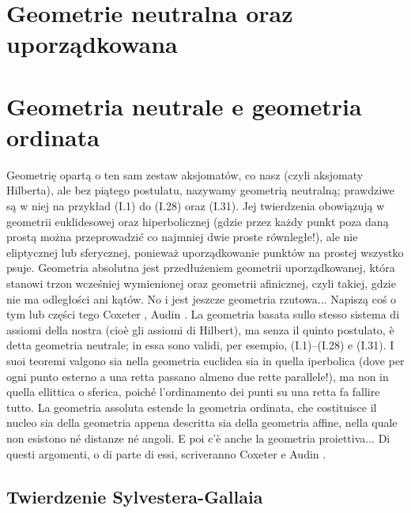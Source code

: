 
%

%

\section{Geometrie neutralna oraz uporządkowana} %
\section{Geometria neutrale e geometria ordinata} %

Geometrię opartą o ten sam zestaw aksjomatów, co nasz (czyli aksjomaty Hilberta), ale bez piątego postulatu, nazywamy geometrią neutralną; prawdziwe są w niej na przykład (I.1) do (I.28) oraz (I.31). %
Jej twierdzenia obowiązują w geometrii euklidesowej oraz hiperbolicznej (gdzie przez każdy punkt poza daną prostą można przeprowadzić co najmniej dwie proste równległe!), ale nie eliptycznej lub sferycznej, ponieważ uporządkowanie punktów na prostej wszystko psuje. %
Geometria absolutna jest przedłużeniem geometrii uporządkowanej, która stanowi trzon wcześniej wymienionej oraz geometrii afinicznej, czyli takiej, gdzie nie ma odległości ani kątów. %
No i jest jeszcze geometria rzutowa... %
Napiszą coś o tym lub części tego Coxeter \cite[s. 193, 194]{coxeter_1967}, Audin \cite[s. 13]{audin_2003}. %
La geometria basata sullo stesso sistema di assiomi della nostra (cioè gli assiomi di Hilbert), ma senza il quinto postulato, è detta geometria neutrale; in essa sono validi, per esempio, (I.1)--(I.28) e (I.31). %
I suoi teoremi valgono sia nella geometria euclidea sia in quella iperbolica (dove per ogni punto esterno a una retta passano almeno due rette parallele!), ma non in quella ellittica o sferica, poiché l'ordinamento dei punti su una retta fa fallire tutto. %
La geometria assoluta estende la geometria ordinata, che costituisce il nucleo sia della geometria appena descritta sia della geometria affine, nella quale non esistono né distanze né angoli. %
E poi c'è anche la geometria proiettiva... %
Di questi argomenti, o di parte di essi, scriveranno Coxeter \cite[p. 193, 194]{coxeter_1967} e Audin \cite[p. 13]{audin_2003}. %


\subsection{Twierdzenie Sylvestera-Gallaia} %
